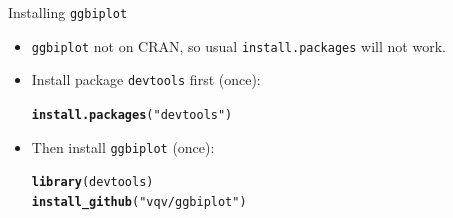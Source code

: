 \documentclass[unknownkeysallowed]{beamer}\usepackage[]{graphicx}\usepackage[]{color}
\makeatletter
\newcommand{\hlstr}[1]{\textcolor[rgb]{0.192,0.494,0.8}{#1}}%
\newcommand{\hlstd}[1]{\textcolor[rgb]{0.345,0.345,0.345}{#1}}%
\newcommand{\hlkwd}[1]{\textcolor[rgb]{0.737,0.353,0.396}{\textbf{#1}}}%
\newenvironment{kframe}{%
 \def\at@end@of@kframe{}%
 \ifinner\ifhmode%
  \def\at@end@of@kframe{\end{minipage}}%
  \begin{minipage}{\columnwidth}%
 \fi\fi%
 \def\FrameCommand##1{\hskip\@totalleftmargin \hskip-\fboxsep
 \colorbox{shadecolor}{##1}\hskip-\fboxsep
     \hskip-\linewidth \hskip-\@totalleftmargin \hskip\columnwidth}%
 \MakeFramed {\advance\hsize-\width
   \@totalleftmargin\z@ \linewidth\hsize
   \@setminipage}}%
 {\par\unskip\endMakeFramed%
 \at@end@of@kframe}
\newenvironment{knitrout}{}{} %
\makeatother
\begin{document}
\begin{frame}[fragile]{Installing \texttt{ggbiplot}}
  
  \begin{itemize}
  \item \texttt{ggbiplot} not on CRAN, so usual
    \texttt{install.packages} will not work.
  \item Install package \texttt{devtools} first (once):
    
\begin{knitrout}
\color{fgcolor}\begin{kframe}
\begin{alltt}
\hlkwd{install.packages}\hlstd{(}\hlstr{"devtools"}\hlstd{)}
\end{alltt}
\end{kframe}
\end{knitrout}
  \item Then install \texttt{ggbiplot} (once):
\begin{knitrout}
\color{fgcolor}\begin{kframe}
\begin{alltt}
\hlkwd{library}\hlstd{(devtools)}
\hlkwd{install_github}\hlstd{(}\hlstr{"vqv/ggbiplot"}\hlstd{)}
\end{alltt}
\end{kframe}
\end{knitrout}
  \end{itemize}
  
\end{frame}
\end{document}
